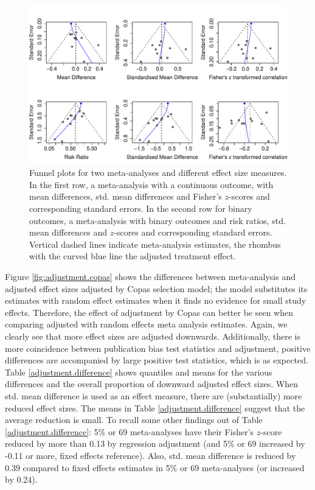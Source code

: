 \documentclass[11pt,a4paper,twoside]{book}\usepackage[]{graphicx}\usepackage[]{color}
\newenvironment{knitrout}{}{} %
\begin{document}
\begin{figure}
\begin{knitrout}
\color{fgcolor}

{\centering \includegraphics[width=\textwidth-3cm]{figure/ch03_figunnamed-chunk-20-1} 

}



\end{knitrout}
\caption{Funnel plots for two meta-analyses and different effect size measures. In the first row, a meta-analysis with a continuous outcome, with mean differences, std. mean differences and Fisher's $z$-scores and corresponding standard errors. In the second row for binary outcomes, a meta-analysis with binary outcomes and risk ratios, std. mean differences and $z$-scores and corresponding standard errors.  Vertical dashed lines indicate meta-analysis estimates, the rhombus with the curved blue line the adjusted treatment effect.}
\label{fig:funnel.plot.change}
\end{figure}


Figure \ref{fig:adjustment.copas} shows the differences between meta-analysis and adjusted effect sizes adjusted by Copas selection model; the model substitutes its estimates with random effect estimates when it finds no evidence for small study effects. Therefore, the effect of adjustment by Copas can better be seen when comparing adjusted with random effects meta analysis estimates. Again, we clearly see that more effect sizes are adjusted downwards. Additionally, there is more coincidence between publication bias test statistics and adjustment, \ie positive differences are accompanied by large positive test statistics, which is as expected. \\
Table \ref{adjustment.difference} shows quantiles and means for the various differences and the overall proportion of downward adjusted effect sizes. When std. mean difference is used as an effect measure, there are (substantially) more reduced effect sizes. The means in Table \ref{adjustment.difference} suggest that the average reduction is small. To recall some other findings out of Table \ref{adjustment.difference}: 5\% or 69 meta-analyses have their Fisher's $z$-score reduced by more than 0.13 by regression adjustment (and 5\% or 69 increased by -0.11 or more, fixed effects reference). Also, std. mean difference is reduced by 0.39 compared to fixed effects estimates in 5\% or 69 meta-analyses (or increased by 0.24). 
\end{document}
